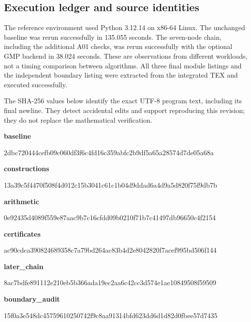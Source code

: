 \documentclass[11pt,a4paper]{article}
\theoremstyle{definition}\newtheorem{definition}[theorem]{Definition}
\theoremstyle{remark}\newtheorem{remark}[theorem]{Remark}
\begin{document}
\subsection{Execution ledger and source identities}

The reference environment used Python 3.12.14 on x86-64 Linux.
The unchanged baseline was rerun successfully in 135.055 seconds.
The seven-node chain, including the additional A01 checks, was rerun
successfully with the optional GMP backend in 38.024
seconds. These are observations from different workloads, not a timing
comparison between algorithms. All three final module listings and the
independent boundary listing were extracted from the integrated TEX and
executed successfully.

The SHA-256 values below identify the exact UTF-8 program text, including
its final newline. They detect accidental edits and support reproducing
this revision; they do not replace the mathematical verification.

\noindent\textbf{baseline}\par
{\ttfamily\scriptsize 2dbc720444cefb09c060df3f6c4fd16c359abfc2b9df5a65a28574d7de05a68a}\par\smallskip
\noindent\textbf{constructions}\par
{\ttfamily\scriptsize 13a39c5f4470f508f4d012c15b3041c61c1b04d9ddad6a4d9a5d820f75f9db7b}\par\smallskip
\noindent\textbf{arithmetic}\par
{\ttfamily\scriptsize 0e92435d4089f559e87aac9b7c16cfdd09b0210f71b7c41497db96650c4f2154}\par\smallskip
\noindent\textbf{certificates}\par
{\ttfamily\scriptsize ac90cdca390824689358c7a79bd264ac83b4d2e8042820f7acef995bd506f144}\par\smallskip
\noindent\textbf{later\_chain}\par
{\ttfamily\scriptsize 8ac7bdfe891112e210eb5b366ada19ec2aa6c42cc3d574e1ae10849508f59509}\par\smallskip
\noindent\textbf{boundary\_audit}\par
{\ttfamily\scriptsize 15f0a3e548dc45759610250742f9c8aa91314bfd623dd6d1d82d0fbee57d7435}\par\smallskip
\end{document}
